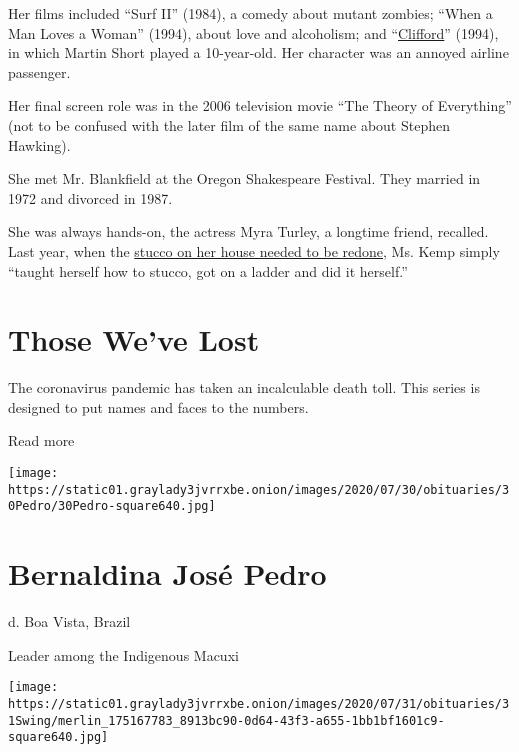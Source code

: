 Her films included ``Surf II'' (1984), a comedy about mutant zombies;
``When a Man Loves a Woman'' (1994), about love and alcoholism; and
``\href{https://www.amazon.com/gp/video/detail/amzn1.dv.gti.80a9f7b8-0c08-88ce-659a-3049f235f807?ref_=imdbref_tt_wbr_pvc_hbo\&tag=imdbtag_tt_wbr_pvc_hbo-20}{Clifford}''
(1994), in which Martin Short played a 10-year-old. Her character was an
annoyed airline passenger.

Her final screen role was in the 2006 television movie ``The Theory of
Everything'' (not to be confused with the later film of the same name
about Stephen Hawking).

She met Mr. Blankfield at the Oregon Shakespeare Festival. They married
in 1972 and divorced in 1987.

She was always hands-on, the actress Myra Turley, a longtime friend,
recalled. Last year, when the
\href{https://www.youtube.com/watch?v=XnuznRkJtow}{stucco on her house
needed to be redone}, Ms. Kemp simply ``taught herself how to stucco,
got on a ladder and did it herself.''

\href{https://www.nytimes3xbfgragh.onion/interactive/2020/obituaries/people-died-coronavirus-obituaries.html?action=click\&pgtype=Article\&state=default\&region=BELOW_MAIN_CONTENT\&context=covid_obits_promo}{}

\hypertarget{those-weve-lost}{%
\section{Those We've Lost}\label{those-weve-lost}}

The coronavirus pandemic has taken an incalculable death toll. This
series is designed to put names and faces to the numbers.

Read more

\texttt{[image: https://static01.graylady3jvrrxbe.onion/images/2020/07/30/obituaries/30Pedro/30Pedro-square640.jpg]}

\hypertarget{bernaldina-josuxe9-pedro}{%
\section{Bernaldina José Pedro}\label{bernaldina-josuxe9-pedro}}

d. Boa Vista, Brazil

Leader among the Indigenous Macuxi

\texttt{[image: https://static01.graylady3jvrrxbe.onion/images/2020/07/31/obituaries/31Swing/merlin\_175167783\_8913bc90-0d64-43f3-a655-1bb1bf1601c9-square640.jpg]}

